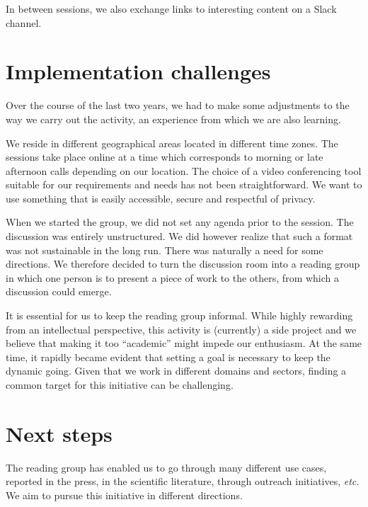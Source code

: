 \documentclass[journal]{IEEEtran}
\begin{document}
In between sessions, we also  exchange links to interesting content on
a Slack channel.

\section{Implementation challenges}

Over the course of the last two years, we had to make some adjustments
to the way we carry out the  activity, an experience from which we are
also learning.

We reside  in different geographical  areas located in  different time
zones. The sessions take place online at a time which corresponds to morning or
late afternoon calls depending on our  location. The choice of a video
conferencing tool suitable for our requirements and needs  has not been
straightforward.   We want to use something that is easily  accessible, secure  and
respectful of privacy.

When we  started the  group, we did  not set any  agenda prior  to the
session.  The discussion  was  entirely unstructured.  We did  however
realize that such a format was  not sustainable in the long run. There
was naturally a need for some directions. We therefore decided to turn
the discussion room into a reading  group in which one person is to
present a  piece of  work to the  others, from  which a
discussion could emerge.

It  is essential  for us  to keep  the reading  group informal.  While
highly rewarding  from an  intellectual perspective, this  activity is
(currently)  a  side  project  and  we  believe  that  making  it  too
“academic” might impede  our enthusiasm. At the same  time, it rapidly
became evident  that setting a goal is  necessary to keep  the dynamic
going. Given that we work in  different domains and sectors, finding a
common target for this initiative can be challenging.

\section{Next steps}

The reading  group has  enabled us  to go  through many  different use
cases, reported  in the press,  in the scientific  literature, through
outreach  initiatives,  \textit{etc.}  We  aim to  pursue  this  initiative  in
different directions.
\end{document}
